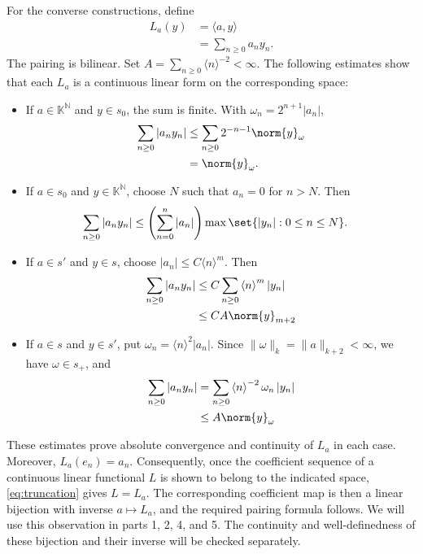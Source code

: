 \documentclass[10pt]{mypackage}
\begin{document}
For the converse constructions, define
\begin{align*}
  L_a(y)&=\langle a,y\rangle\\
        &=\sum_{n\ge0}a_ny_n. 
\end{align*}
The pairing is bilinear. Set \(A=\sum_{n\ge0}\langle n\rangle^{-2}<\infty\). The following estimates show that each \(L_a\) is a continuous linear form on the corresponding space:
\begin{itemize}
 \item If \(a\in\mathbb{K}^{\mathbb{N}}\) and \(y\in s_0\), the sum is finite. With \(\omega_n=2^{n+1}|a_n|\),
   \begin{align*}
     \sum_{n\geq 0} \left\vert a_ny_n \right\vert &\leq \sum_{n\geq 0} 2^{-n-1} \norm{y}_{\omega}\\
                                                  &= \norm{y}_{\omega}.
   \end{align*}
 \item If \(a\in s_0\) and \(y\in\mathbb{K}^{\mathbb{N}}\), choose \(N\) such that \(a_n=0\) for \(n>N\). Then
   \begin{align*}
     \sum_{n\geq 0} \left\vert a_ny_n \right\vert &\leq \left( \sum_{n=0}^{n}\left\vert a_n \right\vert \right) \max\set{\left\vert y_n \right\vert : 0\leq n \leq N}.
   \end{align*}
 \item If \(a\in s'\) and \(y\in s\), choose \(|a_n|\le C\langle n\rangle^m\). Then
   \begin{align*}
     \sum_{n\geq 0} \left\vert a_ny_n \right\vert &\leq C\sum_{n\geq 0} \left\langle n \right\rangle^{m}\left\vert y_n \right\vert\\
                                                  &\leq CA \norm{y}_{m+2}
   \end{align*}
 \item If \(a\in s\) and \(y\in s'\), put \(\omega_n=\langle n\rangle^2|a_n|\). Since \(\|\omega\|_k=\|a\|_{k+2}<\infty\), we have \(\omega\in s_+\), and
   \begin{align*}
     \sum_{n\geq 0} \left\vert a_ny_n \right\vert &= \sum_{n\geq 0} \left\langle n \right\rangle^{-2}\omega_n\left\vert y_n \right\vert\\
                                                  &\leq A\norm{y}_{\omega}
   \end{align*}
\end{itemize}
These estimates prove absolute convergence and continuity of \(L_a\) in each case. Moreover, \(L_a(e_n)=a_n\). Consequently, once the coefficient sequence of a continuous linear functional \(L\) is shown to belong to the indicated space, \eqref{eq:truncation} gives \(L=L_a\). The corresponding coefficient map is then a linear bijection with inverse \(a\mapsto L_a\), and the required pairing formula follows. We will use this observation in parts 1, 2, 4, and 5. The continuity and well-definedness of these bijection and their inverse will be checked separately.
\end{document}
